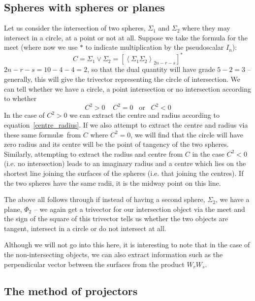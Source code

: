 \subsection{Spheres with spheres or planes}

Let us consider the intersection of two spheres, $\Sigma_1$ and
$\Sigma_2$ where they may intersect in a circle, at a point or not
at all. Suppose we take the formula for the meet (where now we use
$*$ to indicate multiplication by the pseudoscalar $I_n$):
%
\begin{equation}
C = \Sigma_1 \vee \Sigma_2 = \left[\left< \Sigma_1 \Sigma_2
\right>_{2n-r-s}\right]^*
\end{equation}
%
$2n-r-s = 10-4-4=2$, so that the dual quantity will have
grade $5-2=3$ -- generally, this will give the trivector
representing the circle of intersection. We can tell
whether we have a circle, a point intersection or no
intersection according to whether
%
\begin{equation}
C^2 >0 \;\;\;\; C^2 = 0 \;\;\;\mbox{or}\;\;\; C^2<0
\end{equation}
%
In the case of $C^2>0$ we can extract the centre and radius
according to equation~\ref{centre_radius}. If we also attempt to
extract the centre and radius via these same formul\ae\ from $C$
where $C^2=0$, we will find that the circle will have zero radius
and its centre will be the point of tangency of the two spheres.
Similarly, attempting to extract the radius and centre from $C$ in
the case $C^2<0$ (i.e. no intersection) leads to an imaginary
radius and a centre which lies on the shortest line joining the
surfaces of the spheres (i.e. that joining the centres). If the
two spheres have the same radii, it is the midway point on this
line.

The above all follows through if instead of having a
second sphere, $\Sigma_2$, we have a plane, $\Phi_2$ --
we again get a trivector for our intersection object via the meet and the sign
of the square of this trivector tells us whether the two objects are tangent,
intersect in a circle or do not intersect at all.

Although we will not go into this here, it is interesting
to note that in the case of the non-intersecting objects,
we can also extract information such as the perpendicular
vector between the surfaces from the product $W_rW_s$.


\subsection{The method of projectors}
\label{sec:projectors}

